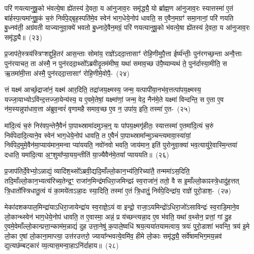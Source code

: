 परि॑ णयत्यानुषू॒को भ॑वत्ये॒षा ह्ये॑तस्य॑ दे॒वता॒ य आ॑नुजाव॒रः समृ॑द्ध्यै॒ यो ब्रा᳚ह्म॒ण आ॑नुजाव॒रः स्यात्तस्मा॑ ए॒तं बा॑र्\mbox{}हस्प॒त्यमा॑नुषू॒कं च॒रुं निर्व॑पे॒द्बृह॒स्पति॑मे॒व स्वेन॑ भाग॒धेये॒नोप॑ धावति॒ स ए॒वैन॒मग्रꣳ॑ समा॒नानां॒ परि॑ णयति बु॒ध्नव॑ती॒ अग्र॑वती याज्यानुवा॒क्ये॑ भवतो बु॒ध्नादे॒वैन॒मग्रं॒ परि॑ णयत्यानुषू॒को भ॑वत्ये॒षा ह्ये॑तस्य॑ दे॒वता॒ य आ॑नुजाव॒रः समृ॑द्ध्यै॥~(२३)

{\anuvakamend[{ए॒व निरग्र॑मे॒तस्य॑ च॒त्वारि॑ च}]}%

प्र॒जा\-प॑ते॒स्त्रय॑स्त्रिꣳशद्दुहि॒तर॑ आस॒न्ताः सोमा॑य॒ राज्ञे॑\-ऽददा॒त्तासाꣳ॑ रोहि॒णीमुपै॒त्ता ईर्ष्य॑न्तीः॒ पुन॑रगच्छ॒न्ता अन्वै॒त्ताः पुन॑रयाचत॒ ता अ॑स्मै॒ न पुन॑रददा॒थ्सो᳚\-ऽब्रवीदृ॒तम॑मीष्व॒ यथा॑ समाव॒च्छ उ॑पै॒ष्याम्यथ॑ ते॒ पुन॑र्दास्या॒मीति॒ स ऋ॒तमा॑मी॒त्ता अ॑स्मै॒ पुन॑रददा॒त्तासाꣳ॑ रोहि॒णीमे॒वोपै॒-~(२४)

त्तं यक्ष्म॑ आर्च्छ॒द्राजा॑नं॒ यक्ष्म॑ आर॒दिति॒ तद्रा॑जय॒क्ष्मस्य॒ जन्म॒ यत्पापी॑या॒नभ॑व॒त्तत्पा॑पय॒क्ष्मस्य॒ यज्जा॒याभ्यो\-ऽवि॑न्द॒त्तज्जा॒येन्य॑स्य॒ य ए॒वमे॒तेषां॒ यक्ष्मा॑णां॒ जन्म॒ वेद॒ नैन॑मे॒ते यक्ष्मा॑ विन्दन्ति॒ स ए॒ता ए॒व न॑म॒स्यन्नुपा॑धाव॒त्ता अ॑ब्रुव॒न्वरं॑ वृणामहै समाव॒च्छ ए॒व न॒ उपा॑य॒ इति॒ तस्मा॑ ए॒त-~(२५)

मा॑दि॒त्यं च॒रुं निर॑वप॒न्तेनै॒वैनं॑ पा॒पाथ्स्रामा॑दमुञ्च॒न्॒ यः पा॑पय॒क्ष्मगृ॑हीतः॒ स्यात्तस्मा॑ ए॒तमा॑दि॒त्यं च॒रुं निर्व॑पेदादि॒त्याने॒व स्वेन॑ भाग॒धेये॒नोप॑ धावति॒ त ए॒वैनं॑ पा॒पाथ्स्रामा᳚न्मुञ्चन्त्यमावा॒स्या॑यां॒ निर्व॑पेद॒मुमे॒वैन॑मा॒प्याय॑मान॒मन्वा प्या॑ययति॒ नवो॑नवो भवति॒ जाय॑\-मान॒ इति॑ पुरोनुवा॒क्या॑ भव॒त्यायु॑रे॒वास्मि॒न्तया॑ दधाति॒ यमा॑\-दि॒त्या अ॒ꣳ॒शुमा᳚प्या॒यय॒न्तीति॑ या॒ज्यैवैन॑मे॒तया᳚ प्याययति॥~(२६)

{\anuvakamend[{ए॒वोपै॒तम॑स्मि॒न्त्रयो॑दश च}]}%

प्र॒जा\-प॑तिर्दे॒वेभ्यो॒\-ऽन्नाद्यं॒ व्यादि॑श॒थ्सो᳚\-ऽब्रवी॒द्यदि॒माँल्लो॒का\-न॒भ्य॑ति॒\-रिच्या॑तै॒ तन्ममा॑\-ऽस॒दिति॒ तदि॒माँल्लो॒का\-न॒भ्यत्य॑रिच्य॒तेन्द्र॒ꣳ॒ राजा॑न॒\-मिन्द्र॑मधिरा॒जमिन्द्रꣴ॑ स्व॒राजा॑नं॒ ततो॒ वै स इ॒माँल्लो॒काꣴस्त्रे॒धा\-दु॑ह॒त्तत् त्रि॒धातो᳚स्त्रिधातु॒त्वं यं का॒मये॑ता\-ऽन्ना॒दः स्या॒दिति॒ तस्मा॑ ए॒तं त्रि॒धातुं॒ निर्व॑पे॒दिन्द्रा॑य॒ राज्ञे॑ पुरो॒डाश॒-~(२७)

मेका॑\-दश\-कपाल॒मिन्द्रा॑या\-ऽधिरा॒जायेन्द्रा॑य स्व॒राज्ञे॒\-ऽयं वा इन्द्रो॒ राजा॒\-ऽयमिन्द्रो॑\-ऽधिरा॒जो॑\-ऽसाविन्द्रः॑ स्व॒राडि॒माने॒व लो॒कान्थ्स्वेन॑ भाग॒धेये॒नोप॑ धावति॒ त ए॒वास्मा॒ अन्नं॒ प्र य॑च्छन्त्यन्ना॒द ए॒व भ॑वति॒ यथा॑ व॒थ्सेन॒ प्रत्तां॒ गां दु॒ह ए॒वमे॒वेमाँल्लो॒कान्प्रत्ता॒न्काम॑म॒न्नाद्यं॑ दुह उत्ता॒नेषु॑ क॒पाले॒ष्वधि॑ श्रय॒त्यया॑तयामत्वाय॒ त्रयः॑ पुरो॒डाशा॑ भवन्ति॒ त्रय॑ इ॒मे लो॒का ए॒षां लो॒काना॒माप्त्या॒ उत्त॑रउत्तरो॒ ज्याया᳚न्भवत्ये॒वमि॑व॒ हीमे लो॒काः समृ॑द्ध्यै॒ सर्वे॑षामभिग॒मय॒न्नव॑ द्य॒त्यछ॑म्बट्कारं व्य॒त्यास॒मन्वा॒हा\-ऽनि॑र्दाहाय॥~(२८)

